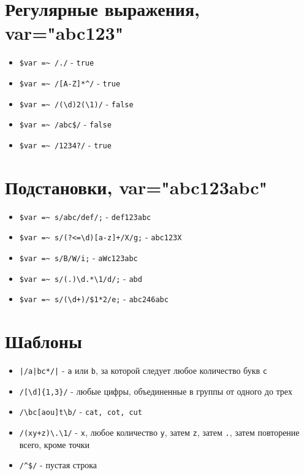 \documentclass[12pt, a4paper]{article}
\begin{document}

\section{Регулярные выражения, var="abc123"}
\begin{itemize}
  \item \verb|$var =~ /./| - \verb|true|
  \item \verb|$var =~ /[A-Z]*^/| - \verb|true|
  \item \verb|$var =~ /(\d)2(\1)/| - \verb|false|
  \item \verb|$var =~ /abc$/| - \verb|false|
  \item \verb|$var =~ /1234?/| - \verb|true|
\end{itemize}
\section{Подстановки, var="abc123abc"}
\begin{itemize}
  \item \verb|$var =~ s/abc/def/;| - \verb|def123abc|
  \item \verb|$var =~ s/(?<=\d)[a-z]+/X/g;| - \verb|abc123X|
  \item \verb|$var =~ s/B/W/i;| - \verb|aWc123abc|
  \item \verb|$var =~ s/(.)\d.*\1/d/;| - \verb|abd|
  \item \verb|$var =~ s/(\d+)/$1*2/e;| - \verb|abc246abc|
\end{itemize}
\section{Шаблоны}
\begin{itemize}
  \item \verb=|/a|bc*/|= - \verb|a| или \verb|b|, за которой следует любое
    количество букв \verb|c|
  \item \verb|/[\d]{1,3}/| - любые цифры, объединенные в группы от одного до
    трех
  \item \verb|/\bc[aou]t\b/| - \verb|cat, cot, cut|
  \item \verb|/(xy+z)\.\1/| - \verb|x|, любое количество \verb|y|, затем \verb|z|,
    затем \verb|.|, затем повторение всего, кроме точки
  \item \verb|/^$/| - пустая строка
\end{itemize}
\end{document}

